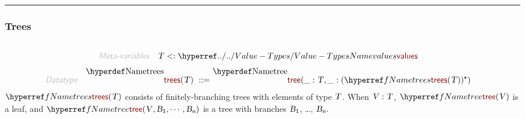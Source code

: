 

\begin{center}
\rule{3in}{0.4pt}
\end{center}

\subsubsection{Trees}\hypertarget{trees}{}\label{trees}

\begin{align*}
  [ \
  \KEY{Datatype} \quad & \NAMEREF{trees} \\
  \KEY{Funcon} \quad & \NAMEREF{tree} \\
  \KEY{Funcon} \quad & \NAMEREF{tree-root-value} \\
  \KEY{Funcon} \quad & \NAMEREF{tree-branch-sequence} \\
  \KEY{Funcon} \quad & \NAMEREF{single-branching-sequence} \\
  \KEY{Funcon} \quad & \NAMEREF{forest-root-value-sequence} \\
  \KEY{Funcon} \quad & \NAMEREF{forest-branch-sequence} \\
  \KEY{Funcon} \quad & \NAMEREF{forest-value-sequence}
  \ ]
\end{align*}
\begin{align*}
  \KEY{Meta-variables} \quad
  & \VAR{T} <: \NAMEHYPER{../..}{Value-Types}{values}
\end{align*}
\begin{align*}
  \KEY{Datatype} \quad 
  \NAMEDECL{trees}(
                     \VAR{T} ) 
  \ ::= \ & \NAMEDECL{tree}(
                               \_ : \VAR{T}, \_ : (  \NAMEREF{trees}
                                               (  \VAR{T} ) )\STAR)
\end{align*}
$\SHADE{\NAMEREF{trees}
           (  \VAR{T} )}$ consists of finitely-branching trees with elements of type $\SHADE{\VAR{T}}$.
  When $\SHADE{\VAR{V} : \VAR{T}}$, $\SHADE{\NAMEREF{tree}
           (  \VAR{V} )}$ is a leaf, and $\SHADE{\NAMEREF{tree}
           (  \VAR{V}, 
                  \VAR{B}\SUB{1}, 
                  \cdots, 
                  \VAR{B}\SUB{n} )}$ is a tree with
  branches $\SHADE{\VAR{B}\SUB{1}}$, \ldots{}, $\SHADE{\VAR{B}\SUB{n}}$.

